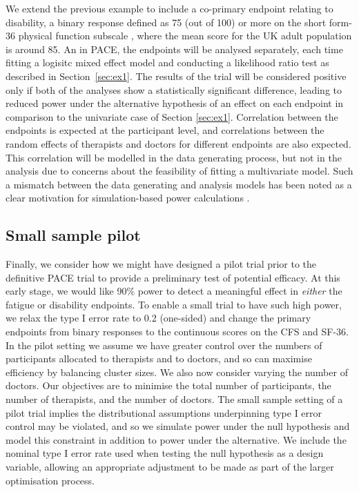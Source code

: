 \documentclass[sagev]{sagej}
\begin{document}
We extend the previous example to include a co-primary endpoint relating to disability, a binary response defined as 75 (out of 100) or more on the short form-36 physical function subscale \cite{McHorney1993}, where the mean score for the UK adult population is around 85. An in PACE, the endpoints will be analysed separately, each time fitting a logisitc mixed effect model and conducting a likelihood ratio test as described in Section~\ref{sec:ex1}. The results of the trial will be considered positive only if both of the analyses show a statistically significant difference, leading to reduced power under the alternative hypothesis of an effect on each endpoint in comparison to the univariate case of Section \ref{sec:ex1}\cite{Senn2007}. Correlation between the endpoints is expected at the participant level, and correlations between the random effects of therapists and doctors for different endpoints are also expected. This correlation will be modelled in the data generating process, but not in the analysis due to concerns about the feasibility of fitting a multivariate model. Such a mismatch between the data generating and analysis models has been noted as a clear motivation for simulation-based power calculations \cite{Landau2013}.

\subsection{Small sample pilot}\label{sec:ex3}

Finally, we consider how we might have designed a pilot trial prior to the definitive PACE trial to provide a preliminary test of potential efficacy. At this early stage, we would like 90\% power to detect a meaningful effect in \emph{either} the fatigue or disability endpoints. To enable a small trial to have such high power, we relax the type I error rate to 0.2 (one-sided) and change the primary endpoints from binary responses to the continuous scores on the CFS and SF-36. In the pilot setting we assume we have greater control over the numbers of participants allocated to therapists and to doctors, and so can maximise efficiency by balancing cluster sizes. We also now consider varying the number of doctors.  Our objectives are to minimise the total number of participants, the number of therapists, and the number of doctors. The small sample setting of a pilot trial implies the distributional assumptions underpinning type I error control may be violated, and so we simulate power under the null hypothesis and model this constraint in addition to power under the alternative. We include the nominal type I error rate used when testing the null hypothesis as a design variable, allowing an appropriate adjustment to be made as part of the larger optimisation process.
 
\end{document}
